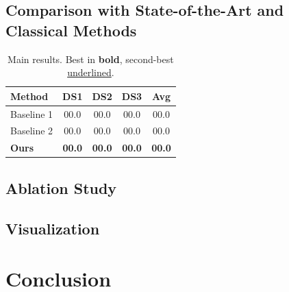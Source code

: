 \documentclass[11pt,a4paper]{article}
\begin{document}
\subsection{Comparison with State-of-the-Art and Classical Methods}
\label{sec:results-main}

\begin{table}[t]
  \centering
  \caption{Main results. Best in \textbf{bold}, second-best \underline{underlined}.}
  \label{tab:main}
  \begin{tabular}{lcccc}
    \toprule
    \textbf{Method} & \textbf{DS1} & \textbf{DS2} & \textbf{DS3} & \textbf{Avg} \\
    \midrule
    Baseline 1 & 00.0 & 00.0 & 00.0 & 00.0 \\
    Baseline 2 & 00.0 & 00.0 & 00.0 & 00.0 \\
    \textbf{Ours} & \textbf{00.0} & \textbf{00.0} & \textbf{00.0} & \textbf{00.0} \\
    \bottomrule
  \end{tabular}
\end{table}

\subsection{Ablation Study}
\label{sec:results-ablation}


\subsection{Visualization}
\label{sec:results-visual}


\section{Conclusion}
\label{sec:conclusion}


\end{document}
